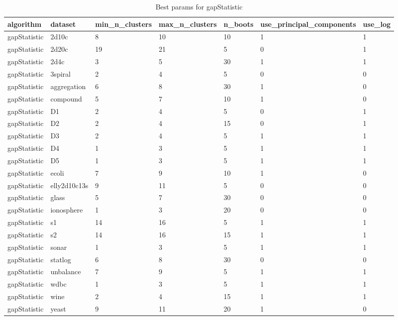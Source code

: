 \begin{table}[H]
\centering
\caption{Best params for gapStatistic}
\label{S25_Table}
\begin{tabular}{|l|l|l|l|l|l|l|}
\hline
algorithm & dataset & min\_n\_clusters & max\_n\_clusters & n\_boots & use\_principal\_components & use\_log \\
\hline
gapStatistic & 2d10c & 8 & 10 & 10 & 1 & 1 \\
\hline
gapStatistic & 2d20c & 19 & 21 & 5 & 0 & 1 \\
\hline
gapStatistic & 2d4c & 3 & 5 & 30 & 1 & 1 \\
\hline
gapStatistic & 3spiral & 2 & 4 & 5 & 0 & 0 \\
\hline
gapStatistic & aggregation & 6 & 8 & 30 & 1 & 0 \\
\hline
gapStatistic & compound & 5 & 7 & 10 & 1 & 0 \\
\hline
gapStatistic & D1 & 2 & 4 & 5 & 0 & 1 \\
\hline
gapStatistic & D2 & 2 & 4 & 15 & 0 & 1 \\
\hline
gapStatistic & D3 & 2 & 4 & 5 & 1 & 1 \\
\hline
gapStatistic & D4 & 1 & 3 & 5 & 1 & 1 \\
\hline
gapStatistic & D5 & 1 & 3 & 5 & 1 & 1 \\
\hline
gapStatistic & ecoli & 7 & 9 & 10 & 1 & 0 \\
\hline
gapStatistic & elly2d10c13s & 9 & 11 & 5 & 0 & 0 \\
\hline
gapStatistic & glass & 5 & 7 & 30 & 0 & 0 \\
\hline
gapStatistic & ionosphere & 1 & 3 & 20 & 0 & 0 \\
\hline
gapStatistic & s1 & 14 & 16 & 5 & 1 & 1 \\
\hline
gapStatistic & s2 & 14 & 16 & 15 & 1 & 1 \\
\hline
gapStatistic & sonar & 1 & 3 & 5 & 1 & 1 \\
\hline
gapStatistic & statlog & 6 & 8 & 30 & 0 & 0 \\
\hline
gapStatistic & unbalance & 7 & 9 & 5 & 1 & 1 \\
\hline
gapStatistic & wdbc & 1 & 3 & 5 & 1 & 1 \\
\hline
gapStatistic & wine & 2 & 4 & 15 & 1 & 1 \\
\hline
gapStatistic & yeast & 9 & 11 & 20 & 1 & 0 \\
\hline
\end{tabular}
\end{table}

